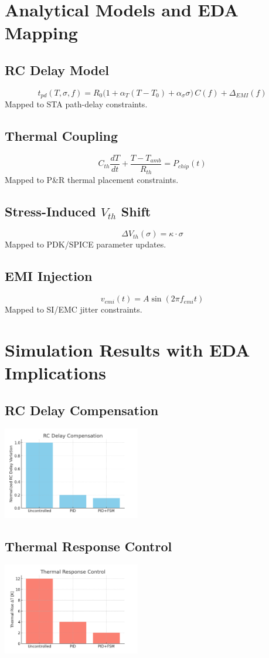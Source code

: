 \documentclass[journal]{IEEEtran} %
\begin{document}
\section{Analytical Models and EDA Mapping}
\subsection{RC Delay Model}
\[
t_{pd}(T,\sigma,f) = R_0 \bigl(1+\alpha_T (T-T_0)+\alpha_\sigma \sigma\bigr)\,C(f)+\Delta_{EMI}(f)
\]
Mapped to STA path-delay constraints.

\subsection{Thermal Coupling}
\[
C_{th}\frac{dT}{dt} + \frac{T-T_{amb}}{R_{th}} = P_{chip}(t)
\]
Mapped to P\&R thermal placement constraints.

\subsection{Stress-Induced $V_{th}$ Shift}
\[
\Delta V_{th}(\sigma)=\kappa \cdot \sigma
\]
Mapped to PDK/SPICE parameter updates.

\subsection{EMI Injection}
\[
v_{emi}(t)=A\sin(2\pi f_{emi} t)
\]
Mapped to SI/EMC jitter constraints.

\section{Simulation Results with EDA Implications}
\subsection{RC Delay Compensation}
\includegraphics[width=0.45\textwidth]{sim_delay_rc.png}

\subsection{Thermal Response Control}
\includegraphics[width=0.45\textwidth]{sim_thermal_response.png}
\end{document}
